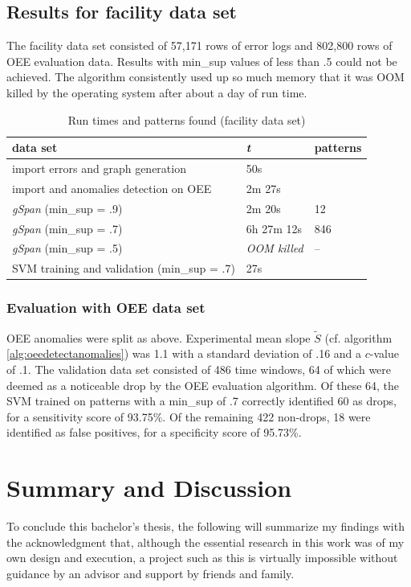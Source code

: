 \documentclass[pdftex,12pt,a4paper]{report}
\begin{document}
\section{Results for facility data set}
The facility data set consisted of 57,171 rows of error logs and 802,800 rows of OEE evaluation data. Results with min\_sup values of less than .5 could not be achieved. The algorithm consistently used up so much memory that it was OOM killed by the operating system after about a day of run time.

\begin{table}
	\centering
	\caption{Run times and patterns found (facility data set)}
	\label{table:runtimes_real} 
	\begin{tabular}{l|l|l}
		data set                                      & \textit{t}          & patterns \\ \hline
		import errors and graph generation            & 50s                 &          \\
		import and anomalies detection on OEE         & 2m 27s              &          \\ \hline
		\textit{gSpan} (min\_sup = .9)                & 2m 20s              & 12       \\
		\textit{gSpan} (min\_sup = .7)                & 6h 27m 12s          & 846      \\
		\textit{gSpan} (min\_sup = .5)                & \textit{OOM killed} & --       \\ \hline
		SVM training and validation   (min\_sup = .7) & 27s                 &
	\end{tabular}
\end{table}

\subsection{Evaluation with OEE data set}
\label{subsection:evaluation}
OEE anomalies were split as above. Experimental mean slope $\tilde{S}$ (cf. algorithm \ref{alg:oeedetectanomalies}) was 1.1 with a standard deviation of .16 and a $c$-value of .1. The validation data set consisted of 486 time windows, 64 of which were deemed as a noticeable drop by the OEE evaluation algorithm. Of these 64, the SVM trained on patterns with a min\_sup of .7 correctly identified 60 as drops, for a sensitivity score of 93.75\%. Of the remaining 422 non-drops, 18 were identified as false positives, for a specificity score of 95.73\%.

\chapter{Summary and Discussion}
To conclude this bachelor's thesis, the following will summarize my findings with the acknowledgment that, although the essential research in this work was of my own design and execution, a project such as this is virtually impossible without guidance by an advisor and support by friends and family.
\end{document}

